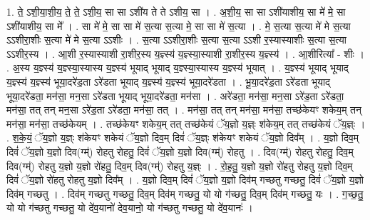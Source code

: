 \documentclass[17pt]{extarticle}
\begin{document}
1. ते॒ ऽशी॒या॒शी॒य॒ ते॒ ते॒ ऽशी॒य॒ सा सा ऽशी॑य ते ते ऽशीय॒ सा । . अ॒शी॒य॒ सा सा ऽशी॑याशीय॒ सा मे॑ मे॒ सा ऽशी॑याशीय॒ सा मे᳚ । . सा मे॑ मे॒ सा सा मे॑ स॒त्या स॒त्या मे॒ सा सा मे॑ स॒त्या । . मे॒ स॒त्या स॒त्या मे॑ मे स॒त्या ऽऽशीरा॒शीः स॒त्या मे॑ मे स॒त्या ऽऽशीः । . स॒त्या ऽऽशीरा॒शीः स॒त्या स॒त्या ऽऽशी र॒स्यास्याशीः स॒त्या स॒त्या ऽऽशीर॒स्य । . आ॒शी र॒स्यास्याशी रा॒शीर॒स्य य॒ज्ञ्स्य॑ य॒ज्ञ्स्या॒स्याशी रा॒शीर॒स्य य॒ज्ञ्स्य॑ । . आ॒शीरित्या᳚ - शीः । . अ॒स्य य॒ज्ञ्स्य॑ य॒ज्ञ्स्या॒स्यास्य य॒ज्ञ्स्य॑ भूयाद् भूयाद् य॒ज्ञ्स्या॒स्यास्य य॒ज्ञ्स्य॑ भूयात् । . य॒ज्ञ्स्य॑ भूयाद् भूयाद् य॒ज्ञ्स्य॑ य॒ज्ञ्स्य॑ भूया॒दरे॑ड॒ता ऽरे॑डता भूयाद् य॒ज्ञ्स्य॑ य॒ज्ञ्स्य॑ भूया॒दरे॑डता । . भू॒या॒दरे॑ड॒ता ऽरे॑डता भूयाद् भूया॒दरे॑डता॒ मन॑सा॒ मन॒सा ऽरे॑डता भूयाद् भूया॒दरे॑डता॒ मन॑सा । . अरे॑डता॒ मन॑सा॒ मन॒सा ऽरे॑ड॒ता ऽरे॑डता॒ मन॑सा॒ तत् तन् मन॒सा ऽरे॑ड॒ता ऽरे॑डता॒ मन॑सा॒ तत् । . मन॑सा॒ तत् तन् मन॑सा॒ मन॑सा॒ तच्छ॑केयꣳ शकेय॒म् तन् मन॑सा॒ मन॑सा॒ तच्छ॑केयम् । . तच्छ॑केयꣳ शकेय॒म् तत् तच्छ॑केयं ॅय॒ज्ञो य॒ज्ञ्ः श॑केय॒म् तत् तच्छ॑केयं ॅय॒ज्ञ्ः । . श॒के॒यं॒ ॅय॒ज्ञो य॒ज्ञ्ः श॑केयꣳ शकेयं ॅय॒ज्ञो दिव॒म् दिवं॑ ॅय॒ज्ञ्ः श॑केयꣳ शकेयं ॅय॒ज्ञो दिव᳚म् । . य॒ज्ञो दिव॒म् दिवं॑ ॅय॒ज्ञो य॒ज्ञो दिव(ग्म्॑) रोहतु रोहतु॒ दिवं॑ ॅय॒ज्ञो य॒ज्ञो दिव(ग्म्॑) रोहतु । . दिव(ग्म्॑) रोहतु रोहतु॒ दिव॒म् दिव(ग्म्॑) रोहतु य॒ज्ञो य॒ज्ञो रो॑हतु॒ दिव॒म् दिव(ग्म्॑) रोहतु य॒ज्ञ्ः । . रो॒ह॒तु॒ य॒ज्ञो य॒ज्ञो रो॑हतु रोहतु य॒ज्ञो दिव॒म् दिवं॑ ॅय॒ज्ञो रो॑हतु रोहतु य॒ज्ञो दिव᳚म् । . य॒ज्ञो दिव॒म् दिवं॑ ॅय॒ज्ञो य॒ज्ञो दिव॑म् गच्छतु गच्छतु॒ दिवं॑ ॅय॒ज्ञो य॒ज्ञो दिव॑म् गच्छतु । . दिव॑म् गच्छतु गच्छतु॒ दिव॒म् दिव॑म् गच्छतु॒ यो यो ग॑च्छतु॒ दिव॒म् दिव॑म् गच्छतु॒ यः । . ग॒च्छ॒तु॒ यो यो ग॑च्छतु गच्छतु॒ यो दे॑व॒यानो॑ देव॒यानो॒ यो ग॑च्छतु गच्छतु॒ यो दे॑व॒यानः॑ । \newline
\end{document}
